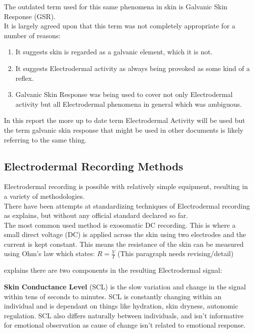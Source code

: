 \documentclass{report}
\begin{document}
The outdated term used for this same phenomena in skin is Galvanic Skin Response (GSR).\\
It is largely agreed upon that this term was not completely appropriate for a number of reasons:
\begin{enumerate}
	\item It suggests skin is regarded as a galvanic element, which it is not.
	\item It suggests Electrodermal activity as always being provoked as some kind of a reflex.
	\item Galvanic Skin Response was being used to cover not only Electrodermal activity but all Electrodermal phenomena in general which was ambiguous.
\end{enumerate}
In this report the more up to date term Electrodermal Activity will be used but the term galvanic skin response that might be used in other documents is likely referring to the same thing.

\subsection{Electrodermal Recording Methods}

Electrodermal recording is possible with relatively simple equipment, resulting in a variety of methodologies.\\
There have been attempts at standardizing techniques of Electrodermal recording as \citep{fowles1981publication} explains, but without any official standard declared so far.\\
The most common used method is exosomatic DC recording. This is where a small direct voltage (DC) is applied across the skin using two electrodes and the current is kept constant. This means the resistance of the skin can be measured using Ohm's law which states: $R = \frac{V}{I}$ (This paragraph needs revising/detail) \citep{boucsein2012electrodermal}

\citep{iMotion2017galvanic} explains there are two components in the resulting Electrodermal signal:

\textbf{Skin Conductance Level} (SCL) is the slow variation and change in the signal within tens of seconds to minutes. SCL is constantly changing within an individual and is dependant
on things like hydration, skin dryness, autonomic regulation. SCL also differs naturally between individuals, and isn't informative for emotional observation as cause of change 
isn't related to emotional response.
\end{document}

